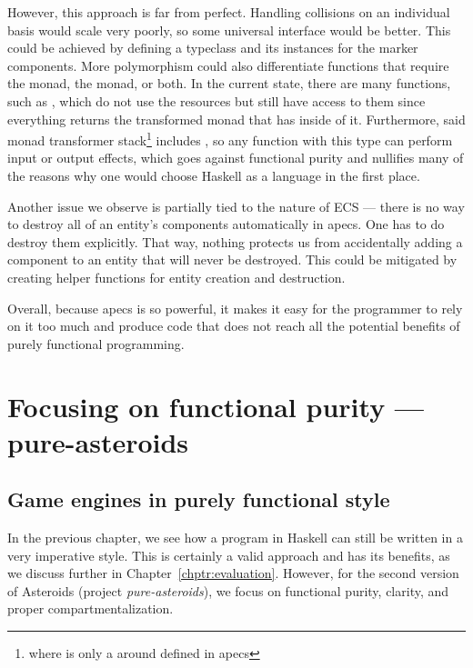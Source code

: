 \documentclass[
  digital, %
  color,   %
  table,   %
  oneside, %
  lof,     %
  lot,     %
]{fithesis3}
\begin{document}
However, this approach is far from perfect. Handling collisions on an
individual basis would scale very poorly, so some universal interface would be better.
This could be achieved by defining a typeclass and its instances for the marker components.
More polymorphism could also differentiate functions that require the
 monad, the  monad, or both.
In the current state, there are many functions, such as ,
which do not use the resources but still have access to them since
everything returns the transformed  monad
that has  inside of it. Furthermore,
said monad transformer stack\footnote{
where  is only a 
around  defined in apecs
}
includes , so any function with this type can perform
input or output effects, which goes against functional purity and nullifies
many of the reasons why one would choose Haskell as a language in the first place.

Another issue we observe is partially tied to the nature of ECS --- there
is no way to destroy all of an entity's components automatically in apecs.
One has to do destroy them explicitly. That way, nothing protects us
from accidentally adding a component to an entity that will never be destroyed.
This could be mitigated by creating helper functions for entity creation and destruction.

Overall, because apecs is so powerful, it makes it easy for the programmer to rely
on it too much and produce code that does not reach all the potential
benefits of purely functional programming.




\chapter{Focusing on functional purity --- pure-asteroids}
\label{chptr:purity}

\section{Game engines in purely functional style}
\label{sect:pureengines}

In the previous chapter, we see how a program in Haskell can still be
written in a very imperative style. 
This is certainly a valid approach and has its benefits, as we discuss
further in Chapter~\ref{chptr:evaluation}. However, for the second version of
Asteroids (project \emph{pure-asteroids}), we focus on functional purity,
clarity, and proper compartmentalization.
\end{document}
